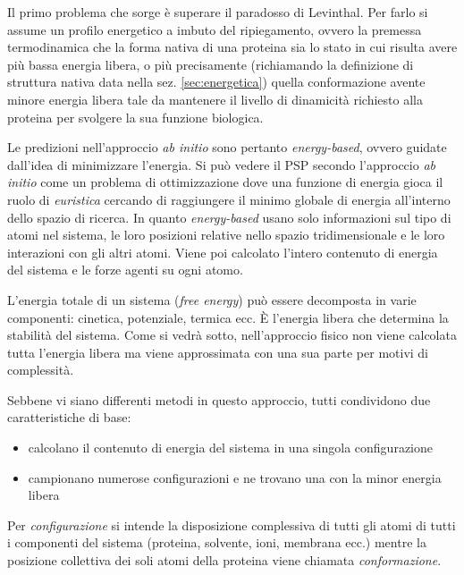{{\par Il primo problema che sorge è superare il paradosso di Levinthal. Per farlo si assume un profilo energetico a imbuto del ripiegamento, ovvero la premessa termodinamica che la forma nativa di una proteina sia lo stato in cui risulta avere più bassa energia libera, o più precisamente (richiamando la definizione di struttura nativa data nella sez. \ref{sec:energetica}) quella conformazione avente minore energia libera tale da mantenere il livello di dinamicità richiesto alla proteina per svolgere la sua funzione biologica.

\par Le predizioni nell'approccio \textit{ab initio} sono pertanto \textit{energy-based}, ovvero guidate dall'idea di minimizzare l'energia. Si può vedere il PSP secondo l'approccio \textit{ab initio} come un problema di ottimizzazione dove una funzione di energia gioca il ruolo di \textit{euristica} cercando di raggiungere il minimo globale di energia all'interno dello spazio di ricerca. In quanto \textit{energy-based} usano solo informazioni sul tipo di atomi nel sistema, le loro posizioni relative nello spazio tridimensionale e le loro interazioni con gli altri atomi. Viene poi calcolato l'intero contenuto di energia del sistema e le forze agenti su ogni atomo. 

\par L'energia totale di un sistema (\textit{free energy}) può essere decomposta in varie componenti: cinetica, potenziale, termica ecc. È l'energia libera che determina la stabilità del sistema. Come si vedrà sotto, nell'approccio fisico non viene calcolata tutta l'energia libera ma viene approssimata con una sua parte per motivi di complessità.

\par Sebbene vi siano differenti metodi in questo approccio, tutti condividono due caratteristiche di base:
\begin{itemize}
	\item calcolano il contenuto di energia del sistema in una singola configurazione
	\item campionano numerose configurazioni e ne trovano una con la minor energia libera
\end{itemize}

Per \textit{configurazione} si intende la disposizione complessiva di tutti gli atomi di tutti i componenti del sistema (proteina, solvente, ioni, membrana ecc.) mentre la posizione collettiva dei soli atomi della proteina viene chiamata \textit{conformazione}.

}}

